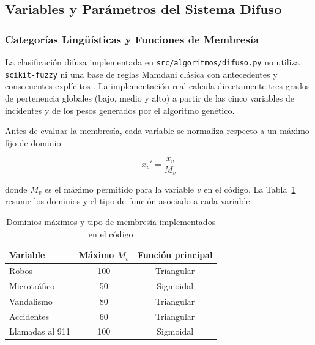 \documentclass[11pt]{article}
\begin{document}
\subsection{Variables y Parámetros del Sistema Difuso}

\subsubsection{Categorías Lingüísticas y Funciones de Membresía}

La clasificación difusa implementada en \texttt{src/algoritmos/difuso.py} no utiliza \texttt{scikit-fuzzy} ni una base de reglas Mamdani clásica con antecedentes y consecuentes explícitos \cite{b7}. La implementación real calcula directamente tres grados de pertenencia globales (bajo, medio y alto) a partir de las cinco variables de incidentes y de los pesos generados por el algoritmo genético.

Antes de evaluar la membresía, cada variable se normaliza respecto a un máximo fijo de dominio:

\begin{equation}
    x_v' = \frac{x_v}{M_v}
\end{equation}

donde $M_v$ es el máximo permitido para la variable $v$ en el código. La Tabla~\ref{tab:dominios} resume los dominios y el tipo de función asociado a cada variable.

\begin{table}[H]
    \centering
    \begin{tabular}{lcc}
        \toprule
        \textbf{Variable} & \textbf{Máximo $M_v$} & \textbf{Función principal} \\
        \midrule
        Robos                & 100 & Triangular \\
        Microtráfico         & 50  & Sigmoidal \\
        Vandalismo           & 80  & Triangular \\
        Accidentes           & 60  & Triangular \\
        Llamadas al 911      & 100 & Sigmoidal \\
        \bottomrule
    \end{tabular}
    \caption{Dominios máximos y tipo de membresía implementados en el código}
    \label{tab:dominios}
\end{table}
\end{document}
